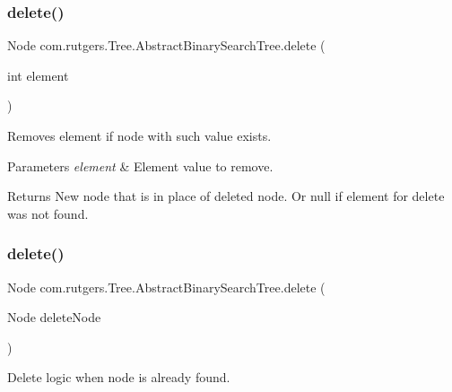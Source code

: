 \subsubsection{\texorpdfstring{delete()}{delete()}\hspace{0.1cm}{\footnotesize\ttfamily [1/2]}}
{\footnotesize\ttfamily Node com.\+rutgers.\+Tree.\+Abstract\+Binary\+Search\+Tree.\+delete (\begin{DoxyParamCaption}\item[{int}]{element }\end{DoxyParamCaption})}

Removes element if node with such value exists.


\begin{DoxyParams}{Parameters}
{\em element} & Element value to remove.\\
\hline
\end{DoxyParams}
\begin{DoxyReturn}{Returns}
New node that is in place of deleted node. Or null if element for delete was not found. 
\end{DoxyReturn}
\mbox{\label{classcom_1_1rutgers_1_1Tree_1_1AbstractBinarySearchTree_ab0b52e6fb9cdac67ef88ac7be48a3b60}} 
\subsubsection{\texorpdfstring{delete()}{delete()}\hspace{0.1cm}{\footnotesize\ttfamily [2/2]}}
{\footnotesize\ttfamily Node com.\+rutgers.\+Tree.\+Abstract\+Binary\+Search\+Tree.\+delete (\begin{DoxyParamCaption}\item[{Node}]{delete\+Node }\end{DoxyParamCaption})\hspace{0.3cm}{\ttfamily [protected]}}

Delete logic when node is already found.


